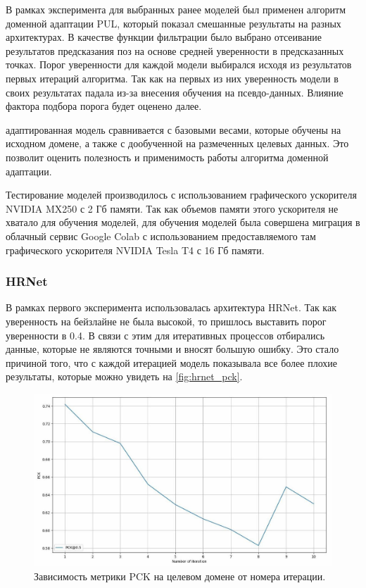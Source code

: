 В рамках эксперимента для выбранных ранее моделей был применен алгоритм доменной адаптации PUL, который показал смешанные результаты на разных архитектурах. В качестве функции фильтрации было выбрано отсеивание результатов предсказания поз на основе средней уверенности в предсказанных точках. Порог уверенности для каждой модели выбирался исходя из результатов первых итераций алгоритма. Так как на первых из них уверенность модели в своих результатах падала из-за внесения обучения на псевдо-данных. Влияние фактора подбора порога будет оценено далее.

 адаптированная модель сравнивается с базовыми весами, которые обучены на исходном домене, а также с дообученной на размеченных целевых данных. Это позволит оценить полезность и применимость работы алгоритма доменной адаптации.

Тестирование моделей производилось с использованием графического ускорителя NVIDIA MX250 с 2 Гб памяти. Так как объемов памяти этого ускорителя не хватало для обучения моделей, для обучения моделей была совершена миграция в облачный сервис Google Colab с использованием предоставляемого там графического ускорителя NVIDIA Tesla T4 с 16 Гб памяти.

\subsubsection*{HRNet}

В рамках первого эксперимента использовалась архитектура HRNet. Так как уверенность на бейзлайне не была высокой, то пришлось выставить порог уверенности в 0.4. В связи с этим для итеративных процессов отбирались данные, которые не являются точными и вносят большую ошибку. Это стало причиной того, что с каждой итерацией модель показывала все более плохие результаты, которые можно увидеть на \autoref{fig:hrnet_pck}.

\begin{figure}[h]
	\centering
	\includegraphics[width=.9\textwidth]{./images/results/hrnet/hrnet_pck}
	\caption{Зависимость метрики PCK на целевом домене от номера итерации.}
	\label{fig:hrnet_pck}
\end{figure}

